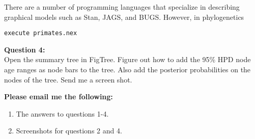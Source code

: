 \documentclass[11pt]{article}
\begin{document}
There are a number of programming languages that specialize in
describing graphical models such as Stan, JAGS, and BUGS.
However, in phylogenetics

\begin{verbatim}
execute primates.nex
\end{verbatim}


\begin{framed}
\noindent
\textbf{Question 4:} \\
Open the summary tree in FigTree. Figure out how to add the 
95\% HPD node age ranges as node bars to the tree. 
Also add the posterior probabilities on the nodes of the tree.
Send me a screen shot.
\end{framed}

\begin{framed}
\noindent
\textbf{Please email me the following:}
\begin{enumerate}
  \item The answers to questions 1-4.
  \item Screenshots for questions 2 and 4.
\end{enumerate}
\end{framed}


 
\end{document}

